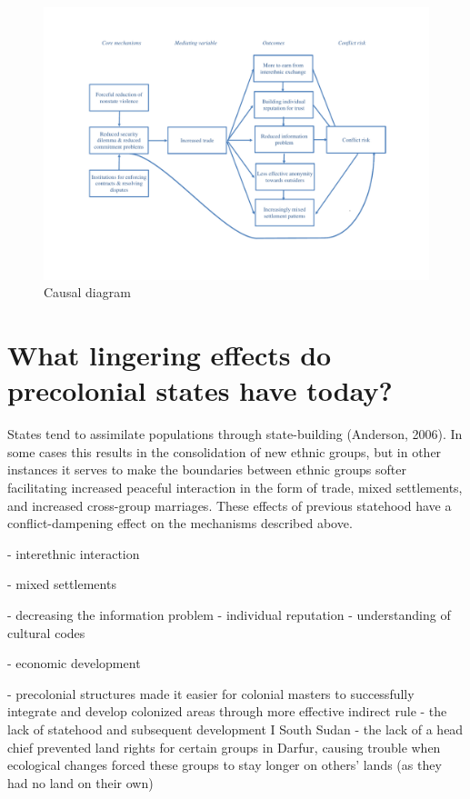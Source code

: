 \documentclass[12pt]{article}
\begin{document}

\begin{figure}[htpb]
	\centering
	\includegraphics[width=0.8\linewidth]{img/Causal diagram.pdf}
	\caption{Causal diagram}
	\label{causal}
\end{figure}

\section{What lingering effects do precolonial states have today?}

States tend to assimilate populations through state-building (Anderson, 2006).
In some cases this results in the consolidation of new ethnic groups, but in
other instances it serves to make the boundaries between ethnic groups softer
facilitating increased peaceful interaction in the form of trade, mixed
settlements, and increased cross-group marriages. These effects of previous
statehood have a conflict-dampening effect on the mechanisms described above.

- interethnic interaction

- mixed settlements

- decreasing the information problem
	- individual reputation
	- understanding of cultural codes

- economic development

- precolonial structures made it easier for colonial masters to successfully
integrate and develop colonized areas through more effective indirect rule
	- the lack of statehood and subsequent development I South Sudan
	- the lack of a head chief prevented land rights for certain groups in
	Darfur, causing trouble when ecological changes forced these groups to
	stay longer on others’ lands (as they had no land on their own)
\end{document}

